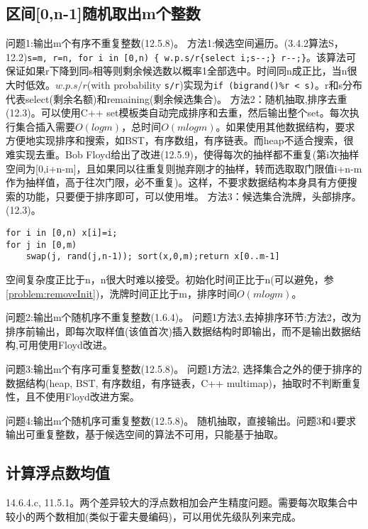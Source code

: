 \subsection{区间[0,n-1]随机取出m个整数}

问题1:输出m个有序不重复整数(\cite{pp}12.5.8)。
方法1:候选空间遍历。(\cite{acp}3.4.2算法S，\cite{pp}12.2)\verb|s=m, r=n, for i in [0,n) { w.p.s/r{select i;s--;} r--;}|。该算法可保证如果r下降到同s相等则剩余候选数以概率1全部选中。时间同n成正比，当n很大时低效。$w.p.s/r$(with probability \verb|s/r|)实现为\verb|if (bigrand()%r < s)|。r和s分布代表select(剩余名额)和remaining(剩余候选集合)。
方法2：随机抽取,排序去重(\cite{pp}12.3)。可以使用C++ set模板类自动完成排序和去重，然后输出整个set。每次执行集合插入需要$O(logm)$，总时间$O(mlog m)$。如果使用其他数据结构\cite{self}，要求方便地实现排序和搜索，如BST，有序数组，有序链表。而heap不适合搜索，很难实现去重。Bob Floyd给出了改进(\cite{pp}12.5.9)，使得每次的抽样都不重复(第i次抽样空间为[0,i+n-m]，且如果同以往重复则抛弃刚才的抽样，转而选取取门限值i+n-m作为抽样值，高于往次门限，必不重复)。这样，不要求数据结构本身具有方便搜索的功能，只要便于排序即可，可以使用堆。
方法3：候选集合洗牌，头部排序。(\cite{pp}12.3)。

\begin{verbatim}
for i in [0,n) x[i]=i; 
for j in [0,m) 
    swap(j, rand(j,n-1)); sort(x,0,m);return x[0..m-1]
\end{verbatim}


空间复杂度正比于n，n很大时难以接受。初始化时间正比于n(可以避免，参\ref{problem:removeInit})，洗牌时间正比于m，排序时间$O(mlogm)$。

问题2:输出m个随机序不重复整数(\cite{pp}1.6.4)。
问题1方法3,去掉排序环节;方法2，改为排序前输出，即每次取样值(该值首次)插入数据结构时即输出，而不是输出数据结构,可用使用Floyd改进。

问题3:输出m个有序可重复整数(\cite{pp}12.5.8)。
问题1方法2, 选择集合之外的便于排序的数据结构(heap, BST, 有序数组，有序链表，C++ multimap)，抽取时不判断重复性，且不使用Floyd改进方案。

问题4:输出m个随机序可重复整数(\cite{pp}12.5.8)。
随机抽取，直接输出。问题3和4要求输出可重复整数，基于候选空间的算法不可用，只能基于抽取。


\subsection{计算浮点数均值}
\cite{pp}14.6.4.c, 11.5.1。两个差异较大的浮点数相加会产生精度问题。需要每次取集合中较小的两个数相加(类似于霍夫曼编码)，可以用优先级队列来完成。

